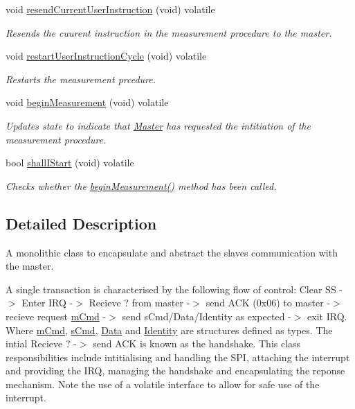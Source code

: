 \begin{DoxyCompactItemize}
void \mbox{\hyperlink{class_master_a8a9c9670d31af14e65157879963e0cf1}{resend\+Current\+User\+Instruction}} (void) volatile
\begin{DoxyCompactList}\small\item\em Resends the cuurent instruction in the measurement procedure to the master. \end{DoxyCompactList}\item 
void \mbox{\hyperlink{class_master_ad50d30dbd09d40661bbdbc1527ff07bf}{restart\+User\+Instruction\+Cycle}} (void) volatile
\begin{DoxyCompactList}\small\item\em Restarts the measurement prcedure. \end{DoxyCompactList}\item 
void \mbox{\hyperlink{class_master_a89cc4d6f65ee9922711cde4ed4bdf31c}{begin\+Measurement}} (void) volatile
\begin{DoxyCompactList}\small\item\em Updates state to indicate that \mbox{\hyperlink{class_master}{Master}} has requested the intitiation of the measurement procedure. \end{DoxyCompactList}\item 
bool \mbox{\hyperlink{class_master_a5d83f02bd26fbe40f249c052454b327b}{shall\+I\+Start}} (void) volatile
\begin{DoxyCompactList}\small\item\em Checks whether the \mbox{\hyperlink{class_master_a89cc4d6f65ee9922711cde4ed4bdf31c}{begin\+Measurement()}} method has been called. \end{DoxyCompactList}\end{DoxyCompactItemize}


\subsection{Detailed Description}
A monolithic class to encapsulate and abstract the slave\textquotesingle{}s communication with the master. 

A single transaction is characterised by the following flow of control\+: Clear SS -\/$>$ Enter I\+RQ -\/$>$ Recieve \textquotesingle{}?\textquotesingle{} from master -\/$>$ send \textquotesingle{}A\+CK\textquotesingle{} (0x06) to master -\/$>$ recieve request \mbox{\hyperlink{structm_cmd}{m\+Cmd}} -\/$>$ send s\+Cmd/\+Data/\+Identity as expected -\/$>$ exit I\+RQ. Where \mbox{\hyperlink{structm_cmd}{m\+Cmd}}, \mbox{\hyperlink{structs_cmd}{s\+Cmd}}, \mbox{\hyperlink{struct_data}{Data}} and \mbox{\hyperlink{struct_identity}{Identity}} are structures defined as types. The intial Recieve \textquotesingle{}?\textquotesingle{} -\/$>$ send \textquotesingle{}A\+CK\textquotesingle{} is known as the handshake. This class\textquotesingle{} responsibilities include intitialising and handling the S\+PI, attaching the interrupt and providing the I\+RQ, managing the handshake and encapsulating the reponse mechanism. Note the use of a volatile interface to allow for safe use of the interrupt. 

